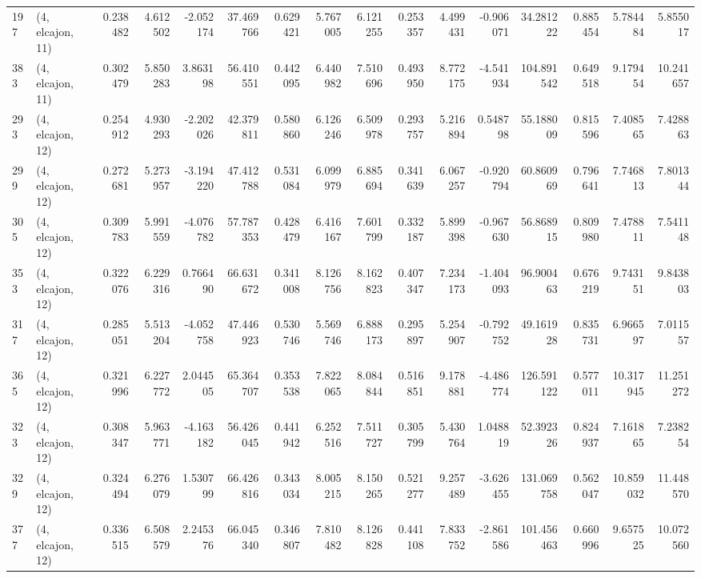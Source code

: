 \begin{tabular}{llrrrrrrrrrrrrrr}
197 &  (4, elcajon, 11) &   0.238482 &   4.612502 &  -2.052174 &    37.469766 &   0.629421 &   5.767005 &   6.121255 &  0.253357 &   4.499431 &  -0.906071 &    34.281222 &   0.885454 &   5.784484 &   5.855017 \\
383 &  (4, elcajon, 11) &   0.302479 &   5.850283 &   3.863198 &    56.410551 &   0.442095 &   6.440982 &   7.510696 &  0.493950 &   8.772175 &  -4.541934 &   104.891542 &   0.649518 &   9.179454 &  10.241657 \\
293 &  (4, elcajon, 12) &   0.254912 &   4.930293 &  -2.202026 &    42.379811 &   0.580860 &   6.126246 &   6.509978 &  0.293757 &   5.216894 &   0.548798 &    55.188009 &   0.815596 &   7.408565 &   7.428863 \\
299 &  (4, elcajon, 12) &   0.272681 &   5.273957 &  -3.194220 &    47.412788 &   0.531084 &   6.099979 &   6.885694 &  0.341639 &   6.067257 &  -0.920794 &    60.860969 &   0.796641 &   7.746813 &   7.801344 \\
305 &  (4, elcajon, 12) &   0.309783 &   5.991559 &  -4.076782 &    57.787353 &   0.428479 &   6.416167 &   7.601799 &  0.332187 &   5.899398 &  -0.967630 &    56.868915 &   0.809980 &   7.478811 &   7.541148 \\
353 &  (4, elcajon, 12) &   0.322076 &   6.229316 &   0.766490 &    66.631672 &   0.341008 &   8.126756 &   8.162823 &  0.407347 &   7.234173 &  -1.404093 &    96.900463 &   0.676219 &   9.743151 &   9.843803 \\
317 &  (4, elcajon, 12) &   0.285051 &   5.513204 &  -4.052758 &    47.446923 &   0.530746 &   5.569746 &   6.888173 &  0.295897 &   5.254907 &  -0.792752 &    49.161928 &   0.835731 &   6.966597 &   7.011557 \\
365 &  (4, elcajon, 12) &   0.321996 &   6.227772 &   2.044505 &    65.364707 &   0.353538 &   7.822065 &   8.084844 &  0.516851 &   9.178881 &  -4.486774 &   126.591122 &   0.577011 &  10.317945 &  11.251272 \\
323 &  (4, elcajon, 12) &   0.308347 &   5.963771 &  -4.163182 &    56.426045 &   0.441942 &   6.252516 &   7.511727 &  0.305799 &   5.430764 &   1.048819 &    52.392326 &   0.824937 &   7.161865 &   7.238254 \\
329 &  (4, elcajon, 12) &   0.324494 &   6.276079 &   1.530799 &    66.426816 &   0.343034 &   8.005215 &   8.150265 &  0.521277 &   9.257489 &  -3.626455 &   131.069758 &   0.562047 &  10.859032 &  11.448570 \\
377 &  (4, elcajon, 12) &   0.336515 &   6.508579 &   2.245376 &    66.045340 &   0.346807 &   7.810482 &   8.126828 &  0.441108 &   7.833752 &  -2.861586 &   101.456463 &   0.660996 &   9.657525 &  10.072560 \\

\end{tabular}
